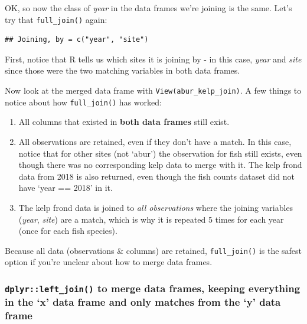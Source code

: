 \documentclass[]{book}
\newenvironment{Shaded}{\begin{snugshade}}{\end{snugshade}}
\newcommand{\DecValTok}[1]{\textcolor[rgb]{0.00,0.00,0.81}{#1}}
\newcommand{\KeywordTok}[1]{\textcolor[rgb]{0.13,0.29,0.53}{\textbf{#1}}}
\newcommand{\NormalTok}[1]{#1}
\newcommand{\OperatorTok}[1]{\textcolor[rgb]{0.81,0.36,0.00}{\textbf{#1}}}
\newcommand{\StringTok}[1]{\textcolor[rgb]{0.31,0.60,0.02}{#1}}
\providecommand{\tightlist}{%
  \setlength{\itemsep}{0pt}\setlength{\parskip}{0pt}}
\begin{document}
OK, so now the class of \emph{year} in the data frames we're joining is the same. Let's try that \texttt{full\_join()} again:

\begin{Shaded}
\end{Shaded}

\begin{verbatim}
## Joining, by = c("year", "site")
\end{verbatim}

First, notice that R tells us which sites it is joining by - in this case, \emph{year} and \emph{site} since those were the two matching variables in both data frames.

Now look at the merged data frame with \texttt{View(abur\_kelp\_join)}. A few things to notice about how \texttt{full\_join()} has worked:

\begin{enumerate}
\def\labelenumi{\arabic{enumi}.}
\tightlist
\item
  All columns that existed in \textbf{both data frames} still exist.
\item
  All observations are retained, even if they don't have a match. In this case, notice that for other sites (not `abur') the observation for fish still exists, even though there was no corresponding kelp data to merge with it. The kelp frond data from 2018 is also returned, even though the fish counts dataset did not have `year == 2018' in it.
\item
  The kelp frond data is joined to \emph{all observations} where the joining variables (\emph{year}, \emph{site}) are a match, which is why it is repeated 5 times for each year (once for each fish species).
\end{enumerate}

Because all data (observations \& columns) are retained, \texttt{full\_join()} is the safest option if you're unclear about how to merge data frames.

\hypertarget{dplyrleft_join-to-merge-data-frames-keeping-everything-in-the-x-data-frame-and-only-matches-from-the-y-data-frame}{%
\subsubsection{\texorpdfstring{\texttt{dplyr::left\_join()} to merge data frames, keeping everything in the `x' data frame and only matches from the `y' data frame}{dplyr::left\_join() to merge data frames, keeping everything in the `x' data frame and only matches from the `y' data frame}}\label{dplyrleft_join-to-merge-data-frames-keeping-everything-in-the-x-data-frame-and-only-matches-from-the-y-data-frame}}
\end{document}
